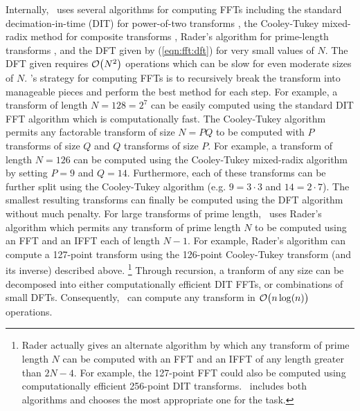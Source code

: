 Internally, \liquid\ uses several algorithms for computing FFTs including
the standard decimation-in-time (DIT) for power-of-two transforms
    \cite[\S10-4]{Ziemer:1998},
the Cooley-Tukey mixed-radix method for composite transforms
    \cite{CooleyTukey:1965},
Rader's algorithm for prime-length transforms \cite{Rader:1968},
and the DFT given by (\ref{eqn:fft:dft}) for very small values of $N$.
The DFT given requires $\mathcal{O}\bigl(N^2\bigr)$ operations
which can be slow for even moderate sizes of $N$.
\liquid's strategy for computing FFTs is to recursively break the
transform into manageable pieces and perform the best method for each
step.
For example, a transform of length $N=128=2^7$ can be easily computed
using the standard DIT FFT algorithm which is computationally fast.
The Cooley-Tukey algorithm permits any factorable transform of size
$N=PQ$ to be computed with
$P$ transforms of size $Q$ and $Q$ transforms of size $P$.
For example, a transform of length $N=126$ can be computed using the
Cooley-Tukey mixed-radix algorithm by setting $P=9$ and $Q=14$.
Furthermore, each of these transforms can be further split using the
Cooley-Tukey algorithm (e.g. $9=3\cdot3$ and $14=2\cdot7$).
The smallest resulting transforms can finally be computed using the DFT
algorithm without much penalty.
For large transforms of prime length, \liquid\ uses Rader's algorithm
\cite{Rader:1968}
which permits any transform of prime length $N$ to be computed using
an FFT and an IFFT each of length $N-1$.
For example, Rader's algorithm can compute a 127-point transform using
the 126-point Cooley-Tukey transform (and its inverse) described above.%
\footnote{Rader actually gives an alternate algorithm by which any
          transform of prime length $N$ can be computed with an FFT and
          an IFFT of any length greater than $2N-4$.
          For example, the 127-point FFT could also be computed using
          computationally efficient 256-point DIT transforms.
          \liquid\ includes both algorithms and chooses the most
          appropriate one for the task.}
Through recursion, a tranform of any size can be decomposed into either
computationally efficient DIT FFTs, or combinations of small DFTs.
% 
%
Consequently, \liquid\ can compute any transform in
$\mathcal{O}\bigl(n\log(n)\bigr)$ operations.

